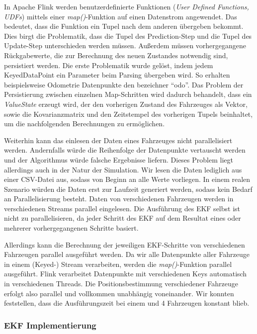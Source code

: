 \documentclass[11pt]{scrartcl}
\begin{document}
{In Apache Flink werden benutzerdefinierte Funktionen (\textit{User Defined Functions, UDFs}) mittels einer \textit{map()}-Funktion auf einen Datenstrom angewendet. Das bedeutet, dass die Funktion ein Tupel nach dem anderen übergeben bekommt. Dies birgt die Problematik, dass die Tupel des Prediction-Step und die Tupel des Update-Step unterschieden werden müssen. Außerdem  müssen vorhergegangene Rückgabewerte, die zur Berechnung des neuen Zustandes notwendig sind, persistiert werden. Die erste Problematik wurde gelöst, indem jedem KeyedDataPoint ein Parameter beim Parsing übergeben wird. So erhalten beispielsweise Odometrie Datenpunkte den bezeichner “odo”. Das Problem der Persistierung zwischen einzelnen Map-Schritten wird dadurch behandelt, dass ein \textit{ValueState} erzeugt wird, der den vorherigen Zustand des Fahrzeuges als Vektor, sowie die Kovarianzmatrix und den Zeitstempel des vorherigen Tupels beinhaltet, um die nachfolgenden Berechnungen zu ermöglichen.

Weiterhin kann das einlesen der Daten eines Fahrzeuges nicht parallelisiert werden. Andernfalls würde die Reihenfolge der Datenpunkte vertauscht werden und der Algorithmus würde falsche Ergebnisse liefern. Dieses Problem liegt allerdings auch in der Natur der Simulation. Wir lesen die Daten lediglich aus einer CSV-Datei aus, sodass von Beginn an alle Werte vorliegen. In einem realen Szenario würden die Daten erst zur Laufzeit generiert werden, sodass kein Bedarf an Parallelisierung besteht. Daten von verschiedenen Fahrzeugen werden in verschiedenen Streams parallel eingelesen. Die Ausführung des EKF selbst ist nicht zu parallelisieren, da jeder Schritt des EKF auf dem Resultat eines oder mehrerer vorhergegangenen Schritte basiert.

Allerdings kann die Berechnung der jeweiligen EKF-Schritte von verschiedenen Fahrzeugen parallel ausgeführt werden. Da wir alle Datenpunkte aller Fahrzeuge in einem (Keyed-) Stream verarbeiten, werden die \textit{map()}-Funktion parallel ausgeführt. Flink verarbeitet Datenpunkte mit verschiedenen Keys automatisch in verschiedenen Threads. Die Positionsbestimmung verschiedener Fahrzeuge erfolgt also parallel und vollkommen unabhängig voneinander. Wir konnten feststellen, dass die Ausführungszeit bei einem und 4 Fahrzeugen konstant blieb.


\subsubsection{EKF Implementierung}\label{EKF-Implementierung}
}
\end{document}
